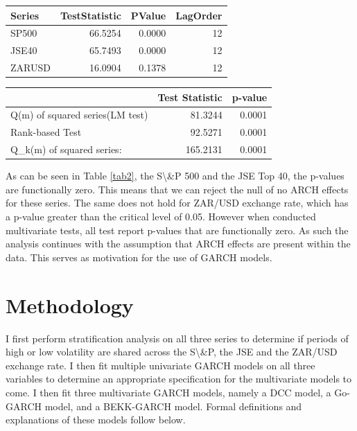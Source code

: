 \documentclass[11pt,preprint, authoryear]{elsarticle}
\let\origtable\table
\let\endorigtable\endtable
\renewenvironment{table}[1][2] {
    \expandafter\origtable\expandafter[H]
} {
    \endorigtable
}
\numberwithin{equation}{section}
\numberwithin{figure}{section}
\numberwithin{table}{section}
\begin{document}
\begin{table}[H]
\centering
\caption{Ljung-Box Tests \label{tab2}} 
\begin{tabular}{lrrr}
  \hline
Series & TestStatistic & PValue & LagOrder \\ 
  \hline
SP500 & 66.5254 & 0.0000 & 12 \\ 
  JSE40 & 65.7493 & 0.0000 & 12 \\ 
  ZARUSD & 16.0904 & 0.1378 & 12 \\ 
   \hline
\end{tabular}
\end{table}

\begin{table}[H]
\centering
\caption{MV Portmanteau Tests \label{tab3}} 
\begin{tabular}{lrr}
  \hline
 & Test Statistic & p-value \\ 
  \hline
Q(m) of squared series(LM test) & 81.3244 & 0.0001 \\ 
  Rank-based Test & 92.5271 & 0.0001 \\ 
  Q\_k(m) of squared series: & 165.2131 & 0.0001 \\ 
   \hline
\end{tabular}
\end{table}

As can be seen in Table \ref{tab2}, the S\textbackslash\&P 500 and the
JSE Top 40, the p-values are functionally zero. This means that we can
reject the null of no ARCH effects for these series. The same does not
hold for ZAR/USD exchange rate, which has a p-value greater than the
critical level of 0.05. However when conducted multivariate tests, all
test report p-values that are functionally zero. As such the analysis
continues with the assumption that ARCH effects are present within the
data. This serves as motivation for the use of GARCH models.

\hypertarget{methodology}{%
\section{Methodology}\label{methodology}}

I first perform stratification analysis on all three series to determine
if periods of high or low volatility are shared across the
S\textbackslash\&P, the JSE and the ZAR/USD exchange rate. I then fit
multiple univariate GARCH models on all three variables to determine an
appropriate specification for the multivariate models to come. I then
fit three multivariate GARCH models, namely a DCC model, a Go-GARCH
model, and a BEKK-GARCH model. Formal definitions and explanations of
these models follow below.
\end{document}
